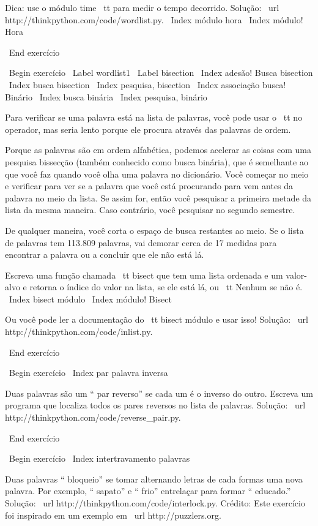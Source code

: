\documentclass[10pt]{book}
\begin{document}
\begin {itemize}
{{{{{{{Dica: use o módulo {time \ tt} para medir o tempo decorrido.
Solução: \ url {http://thinkpython.com/code/wordlist.py}.
\ Index {módulo hora}
\ Index {módulo! Hora}

\ End {} exercício


\ Begin {} exercício
\ Label {} wordlist1
\ Label {} bisection
\ Index {adesão! Busca bisection}
\ Index {busca bisection}
\ Index {pesquisa, bisection}
\ Index {associação busca! Binário}
\ Index {busca binária}
\ Index {pesquisa, binário}

Para verificar se uma palavra está na lista de palavras, você pode usar
o {\ tt no} operador, mas seria lento porque ele procura
através das palavras de ordem.

Porque as palavras são em ordem alfabética, podemos acelerar as coisas
com uma pesquisa bissecção (também conhecido como busca binária), que é
semelhante ao que você faz quando você olha uma palavra no dicionário. Você
começar no meio e verificar para ver se a palavra que você está procurando
para vem antes da palavra no meio da lista. Se assim for, então você
pesquisar a primeira metade da lista da mesma maneira. Caso contrário, você pesquisar
no segundo semestre.

De qualquer maneira, você corta o espaço de busca restantes ao meio. Se o
lista de palavras tem 113.809 palavras, vai demorar cerca de 17 medidas para
encontrar a palavra ou a concluir que ele não está lá.

Escreva uma função chamada {\ tt bisect} que tem uma lista ordenada
e um valor-alvo e retorna o índice do valor
na lista, se ele está lá, ou {\ tt Nenhum} se não é.
\ Index {bisect módulo}
\ Index {módulo! Bisect}

Ou você pode ler a documentação do {\ tt bisect} módulo
e usar isso! Solução: \ url {http://thinkpython.com/code/inlist.py}.

\ End {} exercício

\ Begin {} exercício
\ Index {par palavra inversa}

Duas palavras são um `` par reverso'' se cada um é o inverso do
outro. Escreva um programa que localiza todos os pares reversos no
lista de palavras. Solução: \ url {http://thinkpython.com/code/reverse_pair.py}.

\ End {} exercício

\ Begin {} exercício
\ Index {intertravamento palavras}

Duas palavras `` bloqueio'' se tomar alternando letras de cada formas
uma nova palavra. Por exemplo, `` sapato'' e `` frio''
entrelaçar para formar `` educado.''
Solução: \ url {http://thinkpython.com/code/interlock.py}.
Crédito: Este exercício foi inspirado em um exemplo em \ url {http://puzzlers.org}.

}}}}}}}
\end{itemize}
\end{document}
